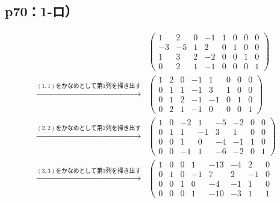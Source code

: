 \documentclass[uplatex,dvipdfmx,a4paper,10pt,fleqn]{jsarticle}
\begin{document}
\subsection*{p70：1-ロ）}
        \begin{tleftbar}
        \begin{align*} 
        &
        \left( 
            \begin{array}{cccc|cccc}
            1 & 2 & 0 & -1 & 1 & 0 & 0 & 0\\ 
            -3 & -5 & 1 & 2 & 0 & 1 & 0 & 0 \\ 
            1 & 3 & 2 & -2 & 0 & 0 & 1 & 0 \\
            0 & 2 & 1 & -1 & 0 & 0 & 0 & 1 
            \end{array}
            \right) \\
           \xrightarrow{\text{$(1,1)$をかなめとして第$1$列を掃き出す}} &
            \left( \begin{array}{cccc|cccc}
            1 & 2 & 0 & -1 & 1 & 0 & 0 & 0\\ 
            0 & 1 & 1 & -1 & 3 & 1 & 0 & 0 \\
            0 & 1 & 2 & -1 & -1 & 0 & 1 & 0 \\
            0 & 2 & 1 & -1 & 0 & 0 & 0 & 1 
            \end{array}
            \right) \\
           \xrightarrow{\text{$(2,2)$をかなめとして第$2$列を掃き出す}} &
           \left( \begin{array}{cccc|cccc}
            1 & 0 & -2 & 1 & -5 & -2 & 0 & 0\\ 
            0 & 1 & 1 & -1 & 3 & 1 & 0 & 0 \\
            0 & 0 & 1 & 0 & -4 & -1 & 1 & 0 \\
            0 & 0 & -1 & 1 & -6 & -2 & 0 & 1 
            \end{array}
            \right) \\
           \xrightarrow{\text{$(3,3)$をかなめとして第$3$列を掃き出す}} &
           \left( \begin{array}{cccc|cccc}
            1 & 0 & 0 & 1 & -13 & -4 & 2 & 0\\ 
            0 & 1 & 0 & -1 & 7 & 2 & -1 & 0 \\
            0 & 0 & 1 & 0 & -4 & -1 & 1 & 0 \\
            0 & 0 & 0 & 1 & -10 & -3 & 1 & 1 
            \end{array}

\end{align*}
\end{tleftbar}
\end{document}
